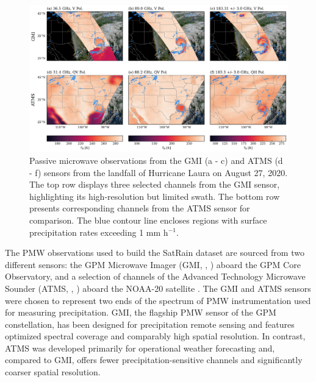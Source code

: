 \documentclass[11pt]{article}
\begin{document}
\begin{figure}[htbp] %
	\centering
	\includegraphics[width=1.0\textwidth]{figures/fig02}
	\caption{
		Passive microwave observations from the GMI (a - c) and ATMS (d - f)
		sensors from the landfall of Hurricane Laura on August 27, 2020. The top
		row displays three selected channels from the GMI sensor, highlighting
		its high-resolution but limited swath. The bottom row presents
		corresponding channels from the ATMS sensor for comparison. The blue
		contour line encloses regions with surface precipitation rates exceeding
		1 mm h$^{-1}$.
	}
	\label{fig:observations_pmw}
\end{figure}

The PMW observations used to build the SatRain dataset are sourced from two
different sensors: the GPM Microwave Imager (GMI, \citeauthor{Draper2015GMI},
\citeyear{Draper2015GMI}) aboard the GPM Core Observatory, and a selection of
channels of the Advanced Technology Microwave Sounder (ATMS,
\citeauthor{Goldberg2006ATMS}, \citeyear{Goldberg2006ATMS}) aboard the NOAA-20
satellite \citep{Goldberg2013Joint}. The GMI and ATMS sensors were chosen to
represent two ends of the spectrum of PMW instrumentation used for measuring
precipitation. GMI, the flagship PMW sensor of the GPM constellation, has been
designed for precipitation remote sensing and features optimized spectral
coverage and comparably high spatial resolution. In contrast, ATMS was developed
primarily for operational weather forecasting and, compared to GMI, offers fewer
precipitation-sensitive channels and significantly coarser spatial resolution.
\end{document}

